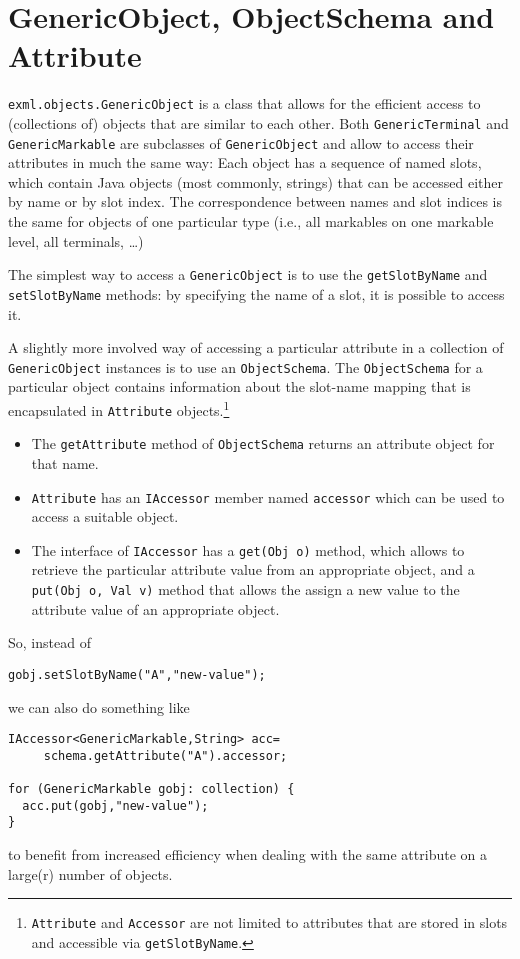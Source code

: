 \documentclass[a4paper,11pt]{report}
\begin{document}
\section{GenericObject, ObjectSchema and Attribute}
\texttt{exml.objects.GenericObject} is a class that allows for the efficient access to
(collections of) objects that are similar to each other. Both \texttt{GenericTerminal}
and \texttt{GenericMarkable} are subclasses of \texttt{GenericObject} and allow to
access their attributes in much the same way: Each object has a sequence of named
slots, which contain Java objects (most commonly, strings) that can be accessed either
by name or by slot index. The correspondence between names and slot indices is the
same for objects of one particular type (i.e., all markables on one markable level,
all terminals, \dots)

The simplest way to access a \texttt{GenericObject} is to use the \texttt{getSlotByName}
and \texttt{setSlotByName} methods: by specifying the name of a slot, it is possible to
access it.

A slightly more involved way of accessing a particular attribute in a
collection of \texttt{GenericObject} instances is to use an \texttt{ObjectSchema}.
The \texttt{ObjectSchema} for a particular object contains information
about the slot-name mapping that is encapsulated in \texttt{Attribute} objects.\footnote{
\texttt{Attribute} and \texttt{Accessor} are not limited to attributes that
are stored in slots and accessible via \texttt{getSlotByName}.}

\begin{itemize}
\item The \texttt{getAttribute} method of \texttt{ObjectSchema} returns an attribute
object for that name.
\item \texttt{Attribute} has an \texttt{IAccessor} member named \texttt{accessor}
which can be used to access a suitable object.
\item The interface of \texttt{IAccessor} has a \texttt{get(Obj o)} method, which allows
to retrieve the particular attribute value from an appropriate object, and
a \texttt{put(Obj o, Val v)} method that allows the assign a new value to the attribute
value of an appropriate object.
\end{itemize}

So, instead of
\begin{verbatim}
gobj.setSlotByName("A","new-value");
\end{verbatim}
\noindent we can also do something like
\begin{verbatim}
IAccessor<GenericMarkable,String> acc=
     schema.getAttribute("A").accessor;

for (GenericMarkable gobj: collection) {
  acc.put(gobj,"new-value");
}
\end{verbatim}
\noindent to benefit from increased efficiency when dealing with the
same attribute on a large(r) number of objects.
\end{document}
